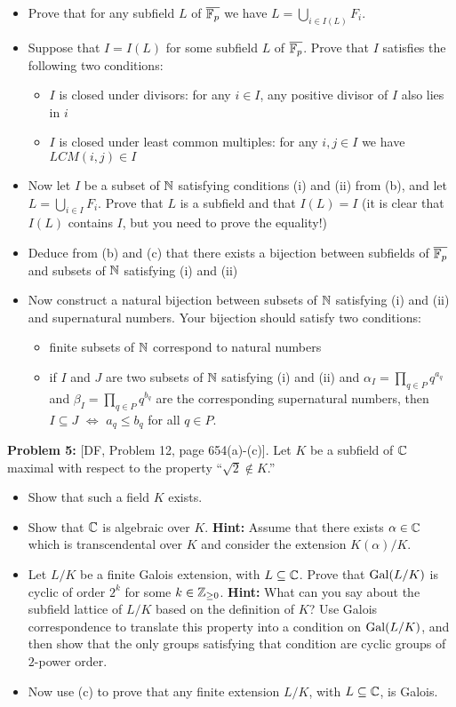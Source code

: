 \documentclass[12pt]{amsart}
\begin{document}
\begin{itemize}
\item[(a)] Prove that for any subfield $L$ of $\overline{{\mathbb F}_p}$ we have $L=\bigcup\limits_{i\in I(L)} F_i$.
\item[(b)] Suppose that $I=I(L)$ for some subfield $L$ of $\overline{{\mathbb F}_p}$. Prove that $I$ satisfies the following two conditions:
\begin{itemize}
\item[(i)] $I$ is closed under divisors: for any $i\in I$, any positive divisor of $I$ also lies in $i$
\item[(ii)] $I$ is closed under least common multiples: for any $i,j\in I$ we have $LCM(i,j)\in I$
\end{itemize}
\item[(c)] Now let $I$ be a subset of ${\mathbb N}$ satisfying conditions (i) and (ii) from (b), and let $L=\bigcup\limits_{i\in I}F_i$. 
Prove that $L$ is a subfield and that $I(L)=I$ (it is clear that $I(L)$ contains $I$, but you need to prove the equality!)
\item[(d)] Deduce from (b) and (c) that there exists a bijection between subfields of $ \overline{{\mathbb F}_p}$ and subsets of ${\mathbb N}$
satisfying (i) and (ii)
\item[(e)] Now construct a natural bijection between subsets of ${\mathbb N}$ satisfying (i) and (ii) and supernatural numbers. Your bijection
should satisfy two conditions: 
\begin{itemize}
\item[(iii)] finite subsets of ${\mathbb N}$ correspond to natural numbers
\item[(iv)] if $I$ and $J$ are two subsets of ${\mathbb N}$ satisfying (i) and (ii) and $\alpha_I=\prod\limits_{q\in P}q^{a_q}$ and
$\beta_I=\prod\limits_{q\in P}q^{b_q}$ are the corresponding supernatural numbers, then $I\subseteq J$ $\iff$ $a_q\leq b_q$ for all $q\in P$.
\end{itemize}  
\end{itemize}  
{\bf Problem 5: } [DF, Problem 12, page 654(a)-(c)]. Let $K$ be a subfield of ${\mathbb C}$ maximal with respect to the property ``$\sqrt{2}\not\in K$.''
\begin{itemize}
\item[(a)] Show that such a field $K$ exists.
\item[(b)] Show that ${\mathbb C}$ is algebraic over $K$. {\bf Hint:} Assume that there exists $\alpha\in {\mathbb C}$ which is transcendental over $K$
and consider the extension $K(\alpha)/K$.
\item[(c1)] Let $L/K$ be a finite Galois extension, with $L\subseteq {\mathbb C}$. Prove that ${\rm Gal}(L/K)$ is cyclic of order $2^k$ for some $k\in{\mathbb Z}_{\geq 0}$. {\bf Hint:} What can you say about the subfield lattice of $L/K$ based on the definition of $K$? Use Galois correspondence to translate this property into a condition on ${\rm Gal}(L/K)$, and then show that the only groups satisfying that condition are cyclic groups of
$2$-power order.
\item[(c2)] Now use (c) to prove that any finite extension $L/K$, with $L\subseteq {\mathbb C}$, is Galois.      
\end{itemize}
\end{document}
